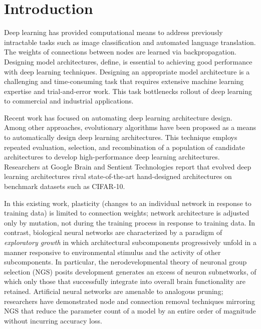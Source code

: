 \section{Introduction}

Deep learning has provided computational means to address previously intractable tasks such as image classification and automated language translation.
The weights of connections between nodes are learned via backpropagation.
Designing model architectures, define, is essential to achieving good performance with deep learning techniques.
Designing an appropriate model architecture is a challenging and time-consuming task that requires extensive machine learning expertise and trial-and-error work.
This task bottlenecks rollout of deep learning to commercial and industrial applications.

Recent work has focused on automating deep learning architecture design.
Among other approaches, evolutionary algorithms have been proposed as a means to automatically design deep learning architectures.
This technique employs repeated evaluation, selection, and recombination of a population of candidate architectures to develop high-performance deep learning architectures.
Researchers at Google Brain\autocite{real2017large} and Sentient Technologies\autocite{miikkulainen2017evolving} report that evolved deep learning architectures rival state-of-the-art hand-designed architectures on benchmark datasets such as CIFAR-10.

In this existing work, plasticity (changes to an individual network in response to training data) is limited to connection weights;
network architecture is adjusted only by mutation, not during the training process in response to training data.
In contrast, biological neural networks are characterized by a paradigm of \textit{exploratory growth} in which architectural subcomponents progressively unfold in a manner responsive to environmental stimulus and the activity of other subcomponents.\autocite{downing2015intelligence}
In particular, the nerodevelopmental theory of neuronal group selection (NGS) posits development generates an excess of neuron subnetworks, of which only those that successfully integrate into overall brain functionality are retained.\autocite{sanes2011development}
Artificial neural networks are amenable to analogous pruning;
researchers have demonstrated node and connection removal techniques mirroring NGS that reduce the parameter count of a model by an entire order of magnitude without incurring accuracy loss.\autocite{song2015learning}


